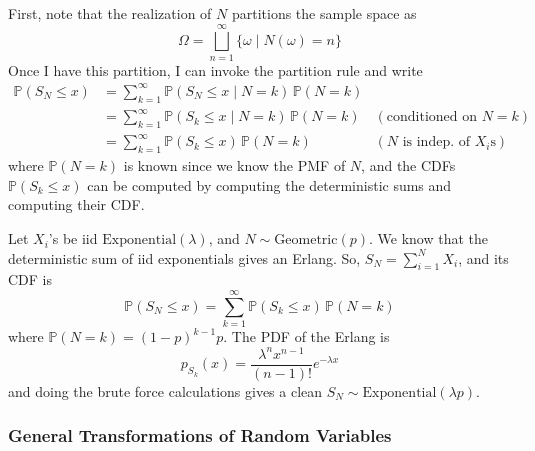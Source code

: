     First, note that the realization of $N$ partitions the sample space as 
    \begin{equation}
      \Omega = \bigsqcup_{n = 1}^\infty \{\omega \mid N(\omega) = n\}
    \end{equation}
    Once I have this partition, I can invoke the partition rule and write 
    \begin{align*}
      \mathbb{P}(S_N \leq x) & = \sum_{k=1}^\infty \mathbb{P}(S_N \leq x \mid N = k) \, \mathbb{P}(N = k) \\
      & = \sum_{k=1}^\infty \mathbb{P}(S_k \leq x \mid N = k) \, \mathbb{P}(N = k) & (\text{conditioned on } N = k) \\
      & = \sum_{k=1}^\infty \mathbb{P}(S_k \leq x) \, \mathbb{P}(N = k) & (N \text{ is indep. of } X_i \text{s})
    \end{align*}
    where $\mathbb{P}(N = k)$ is known since we know the PMF of $N$, and the CDFs $\mathbb{P}(S_k \leq x)$ can be computed by computing the deterministic sums and computing their CDF. 

    \begin{example}
      Let $X_i$'s be iid $\mathrm{Exponential}(\lambda)$, and $N \sim \mathrm{Geometric}(p)$. We know that the deterministic sum of iid exponentials gives an Erlang. So, $S_N = \sum_{i=1}^N X_i$, and its CDF is 
      \begin{equation}
        \mathbb{P}(S_N \leq x) = \sum_{k=1}^\infty \mathbb{P}(S_k \leq x) \, \mathbb{P}(N = k)
      \end{equation}
      where $\mathbb{P}(N = k) = (1 - p)^{k - 1} p$. The PDF of the Erlang is 
      \begin{equation}
        p_{S_k} (x) = \frac{\lambda^n x^{n-1}}{(n - 1)!} e^{-\lambda x}
      \end{equation}
      and doing the brute force calculations gives a clean $S_N \sim \mathrm{Exponential}(\lambda p)$. 
    \end{example}

  \subsubsection{General Transformations of Random Variables}


